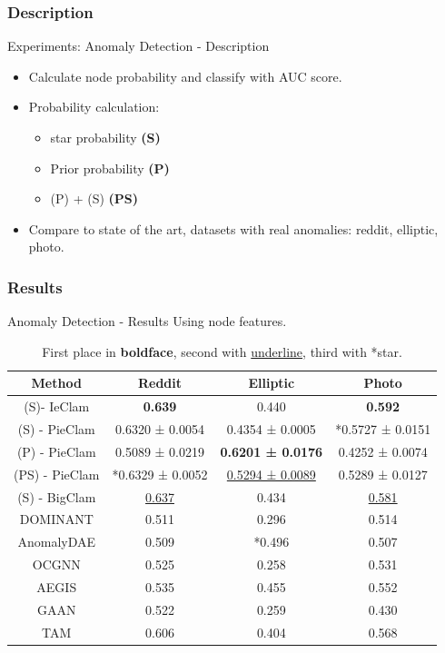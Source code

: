 \documentclass{beamer}
\begin{document}
\subsubsection{Description}
\begin{frame}{Experiments: Anomaly Detection - Description}
\begin{itemize}[itemsep=1em, label=\textbullet]
    \item Calculate node probability and classify with AUC score.
    
    \item Probability calculation:
    \begin{itemize}[itemsep=0.5em, label=\textbullet]
        
        \item star probability \textbf{(S)}
        \item Prior probability \textbf{(P)}
        \item (P) + (S) \textbf{(PS)}
    \end{itemize}
    \item Compare to state of the art, datasets with real anomalies: reddit, elliptic, photo.
\end{itemize}
    
\end{frame}

\subsubsection{Results}
\begin{frame}{Anomaly Detection - Results}
\Large
Using node features.
\begin{table}
\small
\centering
\begin{tabular}{|c|c|c|c|}
    \hline
  Method  & Reddit& Elliptic& Photo\\
    \hline

 (S)- IeClam& \textbf{0.639}& 0.440&\textbf{0.592}\\
 (S) - PieClam& 0.6320 ± 0.0054&  
0.4354 ± 0.0005&*0.5727 ± 0.0151\\
 (P) - PieClam& 0.5089 ± 0.0219& \textbf{0.6201 ± 0.0176}&0.4252 ± 0.0074\\
 (PS) - PieClam& *0.6329 ± 0.0052& \underline{0.5294 ± 0.0089}&0.5289 ± 0.0127\\
 (S) - BigClam & \underline{0.637}& 0.434&\underline{0.581}\\
 \hline
 DOMINANT  & 0.511& 0.296&0.514\\
 AnomalyDAE &0.509& *0.496&0.507\\
 OCGNN  &0.525 & 0.258&0.531\\
 AEGIS &0.535 & 0.455&0.552\\
 GAAN &0.522 &0.259 &0.430\\
 TAM &0.606 & 0.404 & 0.568\\
 \hline
\end{tabular}
\caption{ First place in \textbf{boldface}, second with \underline{underline}, third with *star.}
\end{table}
\end{frame}
\end{document}
